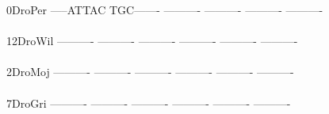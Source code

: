 \documentclass[11pt,twoside,reqno,a4paper]{article}
\begin{document}
{0\hspace*{4\charwidth}DroPer	-----ATTAC	TGC-------	----------	----------	----------	----------	\\
\hspace*{5\charwidth}\hspace*{7\charwidth}\hspace*{1\charwidth}\hspace*{1\charwidth}\hspace*{1\charwidth}\hspace*{1\charwidth}\hspace*{1\charwidth}\hspace*{1\charwidth}\\
12\hspace*{3\charwidth}DroWil	----------	----------	----------	----------	----------	----------	\\
\hspace*{5\charwidth}\hspace*{7\charwidth}\hspace*{1\charwidth}\hspace*{1\charwidth}\hspace*{1\charwidth}\hspace*{1\charwidth}\hspace*{1\charwidth}\hspace*{1\charwidth}\\
2\hspace*{4\charwidth}DroMoj	----------	----------	----------	----------	----------	----------	\\
\hspace*{5\charwidth}\hspace*{7\charwidth}\hspace*{1\charwidth}\hspace*{1\charwidth}\hspace*{1\charwidth}\hspace*{1\charwidth}\hspace*{1\charwidth}\hspace*{1\charwidth}\\
7\hspace*{4\charwidth}DroGri	----------	----------	----------	----------	----------	----------	\\
\hspace*{5\charwidth}\hspace*{7\charwidth}\hspace*{1\charwidth}\hspace*{1\charwidth}\hspace*{1\charwidth}\hspace*{1\charwidth}\hspace*{1\charwidth}\hspace*{1\charwidth}\\
}
\end{document}
